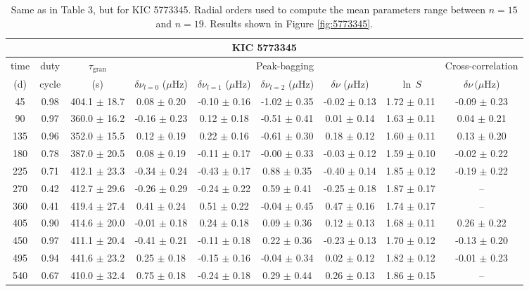 \documentclass[twocolumn]{aastex61}%
\begin{document}
\begin{table}[ht]\centering\fontsize{9.}{7.}\selectfont
\begin{tabular}{ccc|ccccc|c}
\multicolumn{9}{c}{KIC 5773345}\\ \hline\hline
time & duty & $\tau_\text{gran}$ &\multicolumn{5}{c|}{Peak-bagging}&Cross-correlation\\
(d)& cycle & (s)&$\delta\nu_{l=0}$ ($\mu$Hz) & $\delta\nu_{l=1}$ ($\mu$Hz) & $\delta\nu_{l=2}$ ($\mu$Hz) & $\delta\nu$ ($\mu$Hz)& $\ln\,S$ & $\delta\nu\,(\mu$Hz)\\\hline
45 & 0.98 & 404.1 $\pm$ 18.7 & 0.08 $\pm$ 0.20 & -0.10 $\pm$ 0.16 & -1.02 $\pm$ 0.35 & -0.02 $\pm$ 0.13 & 1.72 $\pm$ 0.11 & -0.09 $\pm$ 0.23\\
90 & 0.97 & 360.0 $\pm$ 16.2 & -0.16 $\pm$ 0.23 & 0.12 $\pm$ 0.18 & -0.51 $\pm$ 0.41 & 0.01 $\pm$ 0.14 & 1.63 $\pm$ 0.11 & 0.04 $\pm$ 0.21\\
135 & 0.96 & 352.0 $\pm$ 15.5 & 0.12 $\pm$ 0.19 & 0.22 $\pm$ 0.16 & -0.61 $\pm$ 0.30 & 0.18 $\pm$ 0.12 & 1.60 $\pm$ 0.11 & 0.13 $\pm$ 0.20\\
180 & 0.78 & 387.0 $\pm$ 20.5 & 0.08 $\pm$ 0.19 & -0.11 $\pm$ 0.17 & -0.00 $\pm$ 0.33 & -0.03 $\pm$ 0.12 & 1.59 $\pm$ 0.10 & -0.02 $\pm$ 0.22\\
225 & 0.71 & 412.1 $\pm$ 23.3 & -0.34 $\pm$ 0.24 & -0.43 $\pm$ 0.17 & 0.88 $\pm$ 0.35 & -0.40 $\pm$ 0.14 & 1.85 $\pm$ 0.12 & -0.19 $\pm$ 0.22\\
270 & 0.42 & 412.7 $\pm$ 29.6 & -0.26 $\pm$ 0.29 & -0.24 $\pm$ 0.22 & 0.59 $\pm$ 0.41 & -0.25 $\pm$ 0.18 & 1.87 $\pm$ 0.17 & --\\
360 & 0.41 & 419.4 $\pm$ 27.4 & 0.41 $\pm$ 0.24 & 0.51 $\pm$ 0.22 & -0.04 $\pm$ 0.45 & 0.47 $\pm$ 0.16 & 1.74 $\pm$ 0.17 & --\\
405 & 0.90 & 414.6 $\pm$ 20.0 & -0.01 $\pm$ 0.18 & 0.24 $\pm$ 0.18 & 0.09 $\pm$ 0.36 & 0.12 $\pm$ 0.13 & 1.68 $\pm$ 0.11 & 0.26 $\pm$ 0.22\\
450 & 0.97 & 411.1 $\pm$ 20.4 & -0.41 $\pm$ 0.21 & -0.11 $\pm$ 0.18 & 0.22 $\pm$ 0.36 & -0.23 $\pm$ 0.13 & 1.70 $\pm$ 0.12 & -0.13 $\pm$ 0.20\\
495 & 0.94 & 441.6 $\pm$ 23.2 & 0.25 $\pm$ 0.18 & -0.15 $\pm$ 0.16 & -0.04 $\pm$ 0.34 & 0.02 $\pm$ 0.12 & 1.82 $\pm$ 0.12 & -0.01 $\pm$ 0.23\\
540 & 0.67 & 410.0 $\pm$ 32.4 & 0.75 $\pm$ 0.18 & -0.24 $\pm$ 0.18 & 0.29 $\pm$ 0.44 & 0.26 $\pm$ 0.13 & 1.86 $\pm$ 0.15 & --\\
\end{tabular}
\parbox{2\hsize}{\caption{Same as in Table 3, but for KIC 5773345. Radial orders used to compute the mean parameters range between $n=15$ and $n=19$. Results shown in Figure \ref{fig:5773345}.}\label{tab:5773345}}
\end{table}
\end{document}
